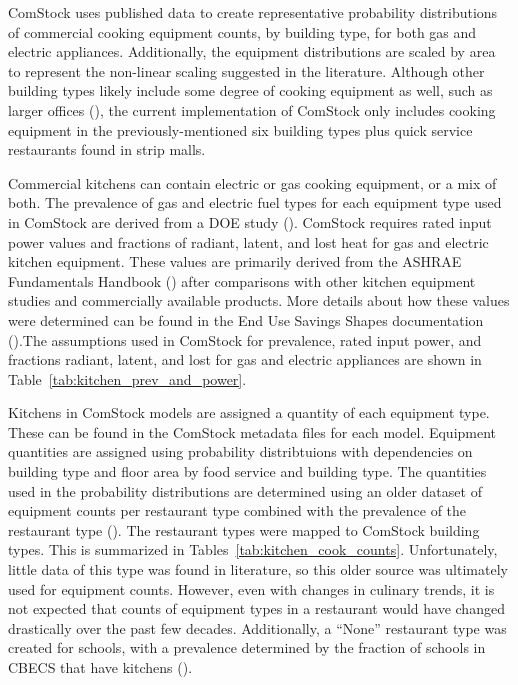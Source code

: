 ComStock uses published data to create representative probability distributions of commercial cooking equipment counts, by building type, for both gas and electric appliances. Additionally, the equipment distributions are scaled by area to represent the non-linear scaling suggested in the literature. Although other building types likely include some degree of cooking equipment as well, such as larger offices (\cite{eia2012cbecs}), the current implementation of ComStock only includes cooking equipment in the previously-mentioned six building types plus quick service restaurants found in strip malls. 

Commercial kitchens can contain electric or gas cooking equipment, or a mix of both. The prevalence of gas and electric fuel types for each equipment type used in ComStock are derived from a DOE study (\cite{goetzler_commercial_appliances}). ComStock requires rated input power values and fractions of radiant, latent, and lost heat for gas and electric kitchen equipment. These values are primarily derived from the ASHRAE Fundamentals Handbook (\cite{ashrae2017}) after comparisons with other kitchen equipment studies and commercially available products. More details about how these values were determined can be found in the End Use Savings Shapes documentation (\cite{nrel89130}).The assumptions used in ComStock for prevalence, rated input power, and fractions radiant, latent, and lost for gas and electric appliances are shown in Table~\ref{tab:kitchen_prev_and_power}. 



Kitchens in ComStock models are assigned a quantity of each equipment type. These can be found in the ComStock metadata files for each model. Equipment quantities are assigned using probability distribtuions with dependencies on building type and floor area by food service and building type. The quantities used in the probability distributions are determined using an older dataset of equipment counts per restaurant type combined with the prevalence of the restaurant type (\cite{com_food_service_equip}). The restaurant types were mapped to ComStock building types. This is summarized in Tables~\ref{tab:kitchen_cook_counts}. Unfortunately, little data of this type was found in literature, so this older source was ultimately used for equipment counts. However, even with changes in culinary trends, it is not expected that counts of equipment types in a restaurant would have changed drastically over the past few decades. Additionally, a “None” restaurant type was created for schools, with a prevalence determined by the fraction of schools in CBECS that have kitchens (\cite{eia2012cbecs}).


